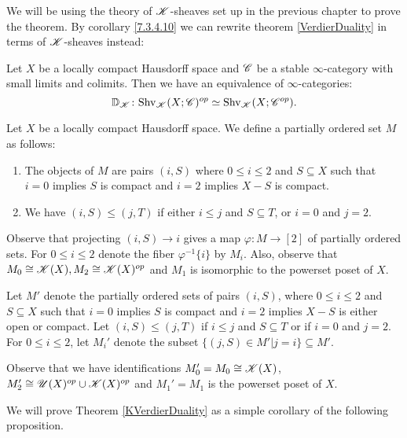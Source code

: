 \documentclass[../../thesis.tex]{subfiles}
\begin{document}
We will be using the theory of $\mathscr{K}$-sheaves set up in the previous chapter to prove the theorem.
By corollary \ref{7.3.4.10} we can rewrite theorem \ref{VerdierDuality} in terms of $\mathscr{K}$-sheaves instead:
\begin{theorem}\label{KVerdierDuality}
    Let $X$ be a locally compact Hausdorff space and $\mathscr{C}$ be a stable $\infty$-category with small limits and colimits.
    Then we have an equivalence of $\infty$-categories:
    \[
        \mathbb{D}_{\mathscr{K}} \colon \mathrm{Shv}_{\mathscr{K}}(X;\mathscr{C})^{op} \simeq \mathrm{Shv}_{\mathscr{K}}(X;\mathscr{C}^{op}).
    \]
\end{theorem}
\begin{definition}[{\cite[Notation 5.5.5.5]{HA}}]\label{5.5.5.5}
    Let $X$ be a locally compact Hausdorff space.
    We define a partially ordered set $M$ as follows:
    \begin{enumerate}
        \item The objects of $M$ are pairs $(i,S)$ where $0 \leq i \leq 2$ and $S \subseteq X$ such that $i=0$ implies $S$ is compact and $i=2$ implies $X-S$ is compact.
        \item We have $(i,S) \leq (j,T)$ if either $i\leq j$ and $S\subseteq T$, or $i=0$ and $j=2$.
    \end{enumerate}
\end{definition}
\begin{remark}[{\cite[Remark 5.5.5.6]{HA}}]
    Observe that projecting $(i,S) \to i$ gives a map $\varphi: M \to [2]$ of partially ordered sets.
    For $0 \leq i \leq 2$ denote the fiber $\varphi^{-1}\{i\}$ by $M_i$.
    Also, observe that $M_0 \cong \mathscr{K}(X), M_2\cong \mathscr{K}(X)^{op}$ and $M_1$ is isomorphic to the powerset poset of $X$.
\end{remark}
\begin{definition}
    Let $M'$ denote the partially ordered sets of pairs $(i,S)$, where $0 \leq i \leq 2$ and $S \subseteq X$ such that $i=0$ implies $S$ is compact and $i=2$ implies $X-S$ is either open or compact.
    Let $(i, S) \leq (j,T)$ if $i\leq j$ and $S\subseteq T$ or if $i=0$ and $j=2$.
    For $0 \leq i \leq 2$, let $M_i'$ denote the subset $\{(j,S) \in M' | j=i\} \subseteq M'$.
\end{definition}
\begin{remark}
    Observe that we have identifications $M_0'=M_0\cong \mathscr{K}(X)$, $M_2' \cong \mathscr{U}(X)^{op} \cup \mathscr{K}(X)^{op}$ and $M_1'=M_1$ is the powerset poset of $X$.
\end{remark}
We will prove Theorem \ref{KVerdierDuality} as a simple corollary of the following proposition.
\end{document}
